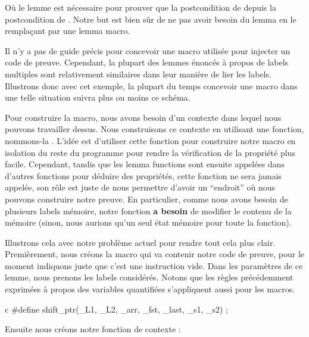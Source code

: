 Où le lemme  est nécessaire pour prouver que la
postcondition de  depuis la postcondition de
. Notre but est bien sûr de ne pas avoir besoin du
lemma en le remplaçant par une lemma macro.


Il n'y a pas de guide précis pour concevoir une macro utilisée pour injecter
un code de preuve. Cependant, la plupart des lemmes énoncés à propos de labels
multiples sont relativement similaires dans leur manière de lier les labels. 
Illustrons donc avec cet exemple, la plupart du temps concevoir une macro dans
une telle situation suivra plus ou moins ce schéma.


Pour construire la macro, nous avons besoin d'un contexte dans lequel nous
pouvons travailler dessus. Nous construisons ce contexte en utilisant une fonction,
nommons-la . L'idée est d'utiliser
cette fonction pour construire notre macro en isolation du reste du programme pour
rendre la vérification de la propriété plus facile. Cependant, tandis que les 
lemma functions sont ensuite appelées dans d'autres fonctions pour déduire des
propriétés, cette fonction ne sera jamais appelée, son rôle est juste de nous
permettre d'avoir un ``endroit'' où nous pouvons construire notre preuve. En
particulier, comme nous avons besoin de plusieurs labels mémoire, notre fonction
\textbf{a besoin} de modifier le contenu de la mémoire (sinon, nous aurions qu'un
seul état mémoire pour toute la fonction).


Illustrons cela avec notre problème actuel pour rendre tout cela plus clair.
Premièrement, nous créons la macro  qui va contenir notre
code de preuve, pour le moment indiquons juste que c'est une instruction vide.
Dans les paramètres de ce lemme, nous prenons les labels considérés. Notons que
les règles précédemment exprimées à propos des variables quantifiées s'appliquent
aussi pour les macros.


\begin{CodeBlock}{c}
#define shift_ptr(_L1, _L2, _arr, _fst, _last, _s1, _s2) ;
\end{CodeBlock}


Ensuite nous créons notre fonction de contexte :





